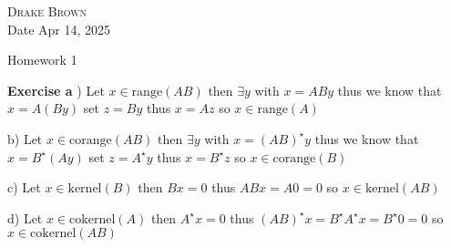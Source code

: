 \documentclass[12pt]{article}
\newenvironment{exercise}[1]{\vspace{.1in}\noindent\textbf{Exercise #1 \hspace{.05em}}}{}
\begin{document}
\DeclarePairedDelimiter\floor{\lfloor}{\rfloor}
\DeclarePairedDelimiter\ceil{\lceil}{\rceil}


\begin{flushright}
	\textsc{Drake Brown}  \\
	Date Apr 14, 2025
\end{flushright}
\begin{center}
	Homework 1
\end{center}
\begin{exercise}{1.1}
	a) Let $x\in \text{range}(AB)$ then $\exists y$ with $x=ABy$ thus we know that $x=A(By)$ set $z=By$ thus $x=Az$ so $x\in \text{range}(A)$

	b) Let $x\in \text{corange}(AB)$ then $\exists y$ with $x=(AB)^\star y$ thus we know that $x=B^\star(Ay)$ set $z=A^\star y$ thus $x=B^\star z$ so $x\in \text{corange}(B)$

	c) Let $x\in \text{kernel}(B)$ then $Bx=0$ thus $ABx=A0=0$ so $x\in \text{kernel} (AB)$

	d) Let $x\in \text{cokernel}(A)$ then $A^\star x=0$ thus $(AB)^\star x= B^\star A^\star x=B^\star0=0$ so $x\in \text{cokernel} (AB)$
\end{exercise}
\end{document}
